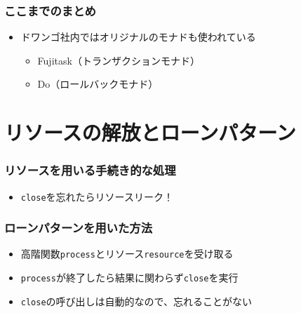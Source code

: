 \begin{frame}
  \frametitle{ここまでのまとめ}

  \begin{center}
  \end{center}

  \begin{itemize}
    \item<3-> ドワンゴ社内ではオリジナルのモナドも使われている
    \begin{itemize}
      \item<4-> Fujitask（トランザクションモナド）\cite{fujitask,scalamatsuri2016,fujitasksimple}
      \item<4-> Do（ロールバックモナド）
    \end{itemize}
  \end{itemize}

  \begin{center}
  \end{center}  
\end{frame}

\section{リソースの解放とローンパターン}

\begin{frame}
  \frametitle{リソースを用いる手続き的な処理}

  
  \begin{itemize}
    \item<3-> \lstinline|close|を忘れたらリソースリーク！
  \end{itemize}
\end{frame}

\begin{frame}
  \frametitle{ローンパターン\cite{loanpattern}を用いた方法}

  
  \begin{itemize}
    \item<3-> 高階関数\lstinline|process|とリソース\lstinline|resource|を受け取る
    \item<4-> \lstinline|process|が終了したら結果に関わらず\lstinline|close|を実行
    \item<5-> \lstinline|close|の呼び出しは自動的なので、忘れることがない
  \end{itemize}
\end{frame}

